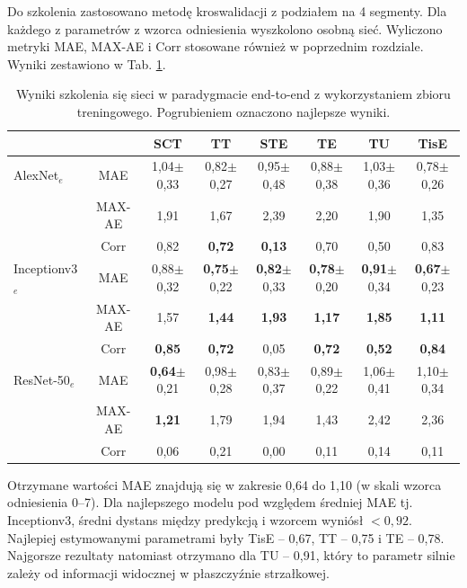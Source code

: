 Do szkolenia zastosowano metodę kroswalidacji z podziałem na 4 segmenty. Dla każdego z parametrów z wzorca odniesienia wyszkolono osobną sieć. Wyliczono metryki MAE, MAX-AE i Corr stosowane również w poprzednim rozdziale. Wyniki zestawiono w Tab. \ref{tab:end-to-endTrain}.
\renewcommand{\arraystretch}{1.2}
\begin{table}[ht]
\scriptsize
\setlength{\tabcolsep}{1pt}
\centering
\caption{Wyniki szkolenia się sieci w paradygmacie end-to-end z wykorzystaniem zbioru treningowego. Pogrubieniem oznaczono najlepsze wyniki.}
\label{tab:end-to-endTrain}
\begin{tabular}{lc||c|c|c|c|c|c}
	&& \textbf{SCT} & \textbf{TT} & \textbf{STE} & \textbf{TE} & \textbf{TU} & \textbf{TisE}\\ \hline \hline
	AlexNet$_{e}$ & MAE & 1,04$\pm$0,33 & 0,82$\pm$0,27 & 0,95$\pm$0,48 & 0,88$\pm$0,38 & 1,03$\pm$0,36 & 0,78$\pm$0,26  \\
	&MAX-AE & 1,91 & 1,67 & 2,39 & 2,20 & 1,90 & 1,35\\ 
	&Corr & 0,82 & \textbf{0,72} & \textbf{0,13} & 0,70 & 0,50 & 0,83 \\ \hline
	Inceptionv3$_{e}$ & MAE & 0,88$\pm$0,32 & \textbf{0,75}$\pm$0,22 & \textbf{0,82}$\pm$0,33 & \textbf{0,78}$\pm$0,20 & \textbf{0,91}$\pm$0,34 & \textbf{0,67}$\pm$0,23 \\
	&MAX-AE & 1,57 & \textbf{1,44} & \textbf{1,93} & \textbf{1,17} & \textbf{1,85} & \textbf{1,11} \\ 
	&Corr & \textbf{0,85} & \textbf{0,72} & 0,05 & \textbf{0,72} & \textbf{0,52} & \textbf{0,84} \\ \hline
	ResNet-50$_{e}$ & MAE & \textbf{0,64}$\pm$0,21 & 0,98$\pm$0,28 & 0,83$\pm$0,37 & 0,89$\pm$0,22 & 1,06$\pm$0,41 & 1,10$\pm$0,34  \\
	&MAX-AE & \textbf{1,21} & 1,79 & 1,94 & 1,43 & 2,42 & 2,36\\
	&Corr & 0,06 & 0,21 & 0,00 & 0,11 & 0,14 & 0,11\\
	
	
\end{tabular}
\end{table}
\renewcommand{\arraystretch}{1}

Otrzymane wartości MAE znajdują się w zakresie 0,64 do 1,10 (w skali wzorca odniesienia 0--7). Dla najlepszego modelu pod względem średniej MAE tj. Inceptionv3, średni dystans między predykcją i wzorcem wyniósł $<0,92$. Najlepiej estymowanymi parametrami były TisE -- 0,67, TT -- 0,75 i TE -- 0,78. Najgorsze rezultaty natomiast otrzymano dla TU -- 0,91, który to parametr silnie zależy od informacji widocznej w płaszczyźnie strzałkowej.

